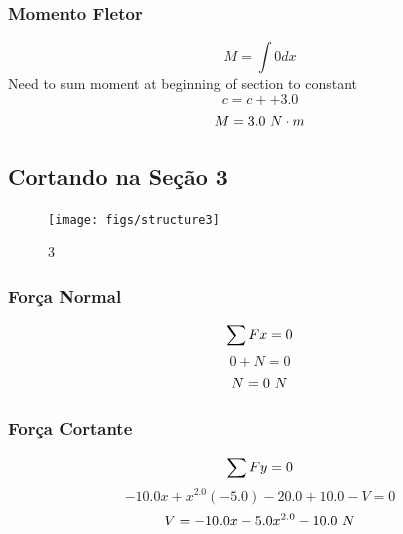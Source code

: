 \documentclass[a4paper,12pt]{article}%
\begin{document}
%
\subsubsection{Momento Fletor}%
\label{ssubsec:MomentoFletor}%
\begin{dmath*}%
M = \int0 dx%
\end{dmath*}%
Need to sum moment at beginning of section to constant%
\begin{dmath*}%
c = c + +3.0%
\end{dmath*}%
\begin{dmath*}%
M = 3.0$ $N \cdot m%
\end{dmath*}

%
\subsection{Cortando na Seção 3}%
\label{subsec:CortandonaSeo3}%


\begin{figure}[H]%
\centering%
\texttt{[image: figs/structure3]}%
\caption{\label{fig:secoes}\label{fig:secoes} 3}%
\end{figure}

%
\subsubsection{Força Normal}%
\label{ssubsec:ForaNormal}%
\begin{dmath*}%
\sum{Fx} = 0 \\%
\end{dmath*}%
\begin{dmath*}%
0 + N = 0%
\end{dmath*}%
\begin{dmath*}%
N = 0$ $N%
\end{dmath*}

%
\subsubsection{Força Cortante}%
\label{ssubsec:ForaCortante}%
\begin{dmath*}%
\sum{Fy} = 0 \\%
\end{dmath*}%
\begin{dmath*}%
- 10.0 x + x^{2.0} \left(-5.0\right) - 20.0 + 10.0 - V = 0%
\end{dmath*}%
\begin{dmath*}%
V = - 10.0 x - 5.0 x^{2.0} - 10.0$ $N%
\end{dmath*}
\end{document}
